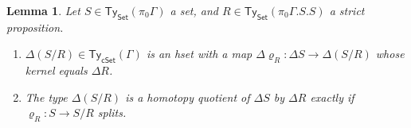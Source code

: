 \documentclass[10pt,a4paper]{article}
\newtheorem{lemma}{Lemma}[section]
\newcommand{\Set}{\mathsf{Set}}
\newcommand{\cSet}{\mathsf{cSet}}
\newcommand\Ty{\mathsf{Ty}}
\begin{document}
\begin{lemma}\label{prop:set-quotient-is-homotopy-quotient-iff-surjection-splits}
  Let \(S \in \Ty_{\Set}(\pi_0\Gamma)\) a set, and \(R \in \Ty_{\Set}(\pi_0\Gamma.S.S)\) a strict proposition.
  \begin{enumerate}[label=(\arabic*)]
    \item\label{prop:set-quotient-is-homotopy-quotient-iff-surjection-splits:well-defined}
      \(\Delta(S/R) \in \Ty_{\cSet}(\Gamma)\) is an hset with a map \(\Delta\varrho_{R} \colon \Delta S \to \Delta(S/R)\) whose kernel equals \(\Delta R\). 
    \item\label{prop:set-quotient-is-homotopy-quotient-iff-surjection-splits:characterization}
      The type \(\Delta(S/R)\) is a homotopy quotient of \(\Delta S\) by \(\Delta R\) exactly if \(\varrho_{R} \colon S \to S/R\) splits.
    \end{enumerate}  
\end{lemma}
\end{document}
